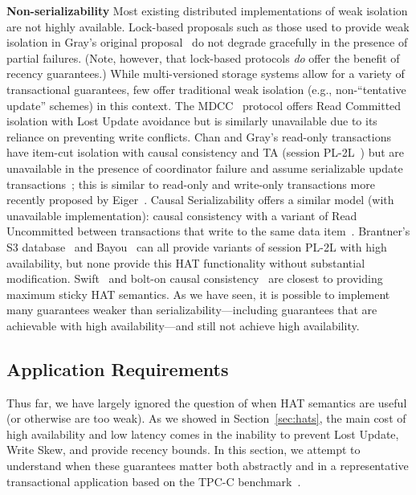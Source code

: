\vspace{.5em}\noindent\textbf{Non-serializability} Most existing
distributed implementations of weak isolation are not highly
available. Lock-based proposals such as those used to provide weak
isolation in Gray's original proposal~\cite{gray-isolation} do not
degrade gracefully in the presence of partial failures. (Note,
however, that lock-based protocols \textit{do} offer the benefit of
recency guarantees.) While multi-versioned storage systems allow for a
variety of transactional guarantees, few offer traditional weak
isolation (e.g., non-``tentative update'' schemes) in this context.
The MDCC~\cite{mdcc} protocol offers Read Committed isolation with
Lost Update avoidance but is similarly unavailable due to its reliance
on preventing write conflicts. Chan and Gray's read-only transactions
have item-cut isolation with causal consistency and TA (session
PL-2L~\cite{adya}) but are unavailable in the presence of coordinator
failure and assume serializable update transactions~\cite{readonly};
this is similar to read-only and write-only transactions more recently
proposed by Eiger~\cite{eiger}. Causal Serializability offers a
similar model (with unavailable implementation): causal consistency
with a variant of Read Uncommitted between transactions that write to
the same data item~\cite{raynal-causal}.  Brantner's S3
database~\cite{kraska-s3} and Bayou~\cite{sessionguarantees} can all
provide variants of session PL-2L with high availability, but none
provide this HAT functionality without substantial
modification. Swift~\cite{swift} and bolt-on causal
consistency~\cite{bolton} are closest to providing maximum sticky HAT
semantics. As we have seen, it is possible to implement many
guarantees weaker than serializability---including guarantees that are
achievable with high availability---and still not achieve high
availability.

\subsection{Application Requirements}

Thus far, we have largely ignored the question of when HAT semantics
are useful (or otherwise are too weak). As we showed in
Section~\ref{sec:hats}, the main cost of high availability and low
latency comes in the inability to prevent Lost Update, Write Skew, and
provide recency bounds. In this section, we attempt to understand when
these guarantees matter both abstractly and in a representative
transactional application based on the TPC-C benchmark~\cite{tpcc}.

